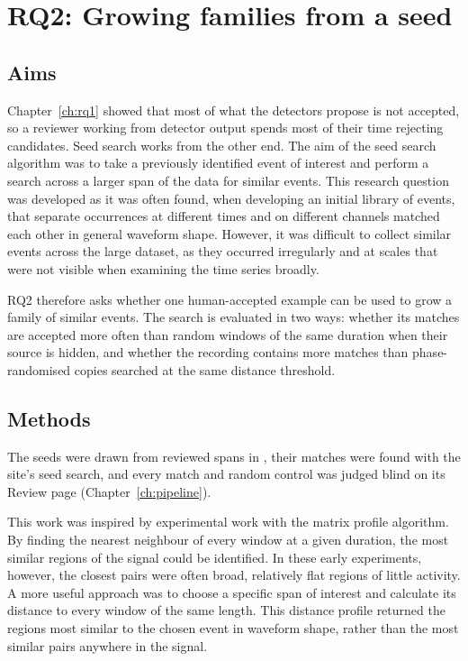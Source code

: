 \chapter{RQ2: Growing families from a seed}
\label{ch:rq2}

\section{Aims}

Chapter~\ref{ch:rq1} showed that most of what the detectors propose is not accepted, so a reviewer working from detector output spends most of their time rejecting candidates. Seed search works from the other end. The aim of the seed search algorithm was to take a previously identified event of interest and perform a search across a larger span of the data for similar events. This research question was developed as it was often found, when developing an initial library of events, that separate occurrences at different times and on different channels matched each other in general waveform shape. However, it was difficult to collect similar events across the large dataset, as they occurred irregularly and at scales that were not visible when examining the time series broadly.

RQ2 therefore asks whether one human-accepted example can be used to grow a family of similar events. The search is evaluated in two ways: whether its matches are accepted more often than random windows of the same duration when their source is hidden, and whether the recording contains more matches than phase-randomised copies searched at the same distance threshold.


\section{Methods}

The seeds were drawn from reviewed spans in \tool{}, their matches were found with the site's seed search, and every match and random control was judged blind on its Review page (Chapter~\ref{ch:pipeline}).

This work was inspired by experimental work with the matrix profile algorithm. By finding the nearest neighbour of every window at a given duration, the most similar regions of the signal could be identified. In these early experiments, however, the closest pairs were often broad, relatively flat regions of little activity. A more useful approach was to choose a specific span of interest and calculate its distance to every window of the same length. This distance profile returned the regions most similar to the chosen event in waveform shape, rather than the most similar pairs anywhere in the signal.


